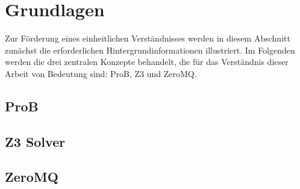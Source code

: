 

\section{Grundlagen}

Zur Förderung eines einheitlichen Verständnisses werden in diesem Abschnitt zunächst die erforderlichen Hintergrundinformationen illustriert.
Im Folgenden werden die drei zentralen Konzepte behandelt, die für das Verständnis dieser Arbeit von Bedeutung sind: ProB, Z3 und ZeroMQ.

\subsection{ProB}
\cite{10.1007/978-3-540-45236-2_46}





\subsection{Z3 Solver}
\cite{10.1007/978-3-031-65627-9_2} \cite{10.1007/978-3-540-78800-3_24}





\subsection{ZeroMQ}
\label{sec:zeromq}
\cite{hintjens2013zeromq} \cite{sustrik2015zeromq}

